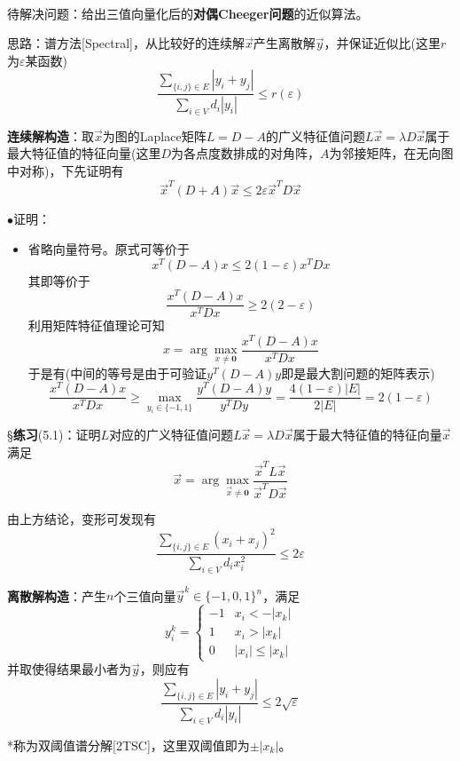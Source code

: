 \documentclass[a4paper,UTF8,fontset=windows]{ctexart}
\newcommand{\exce}[2]{\S\textbf{练习}(#1)：{\kaishu #2}}
\newcommand{\proo}[1]{{\kaishu $\bullet$证明：
\begin{itemize}
    \item[] #1
\end{itemize}
}}
\begin{document}
\

待解决问题：给出三值向量化后的\textbf{对偶Cheeger问题}的近似算法。

思路：谱方法[Spectral]，从比较好的连续解$\vec{x}$产生离散解$\vec{y}$，并保证近似比(这里$r$为$\varepsilon$某函数)
$$\frac{\sum_{\{i,j\}\in E}|y_i+y_j|}{\sum_{i\in V}d_i|y_i|}\le r(\varepsilon)$$

\textbf{连续解构造}：取$\vec{x}$为图的Laplace矩阵$L=D-A$的广义特征值问题$L\vec{x}=\lambda D\vec{x}$属于最大特征值的特征向量(这里$D$为各点度数排成的对角阵，$A$为邻接矩阵，在无向图中对称)，下先证明有
$$\vec{x}^T(D+A)\vec{x}\le2\varepsilon\vec{x}^TD\vec{x}$$
\proo{
    省略向量符号。原式可等价于
    $$x^T(D-A)x\le2(1-\varepsilon)x^TDx$$
    其即等价于
    $$\frac{x^T(D-A)x}{x^TDx}\ge2(2-\varepsilon)$$
    利用矩阵特征值理论可知
    $$x=\arg\max_{x\ne\mathbf{0}}\frac{x^T(D-A)x}{x^TDx}$$
    于是有(中间的等号是由于可验证$y^T(D-A)y$即是最大割问题的矩阵表示)
    $$\frac{x^T(D-A)x}{x^TDx}\ge\max_{y_i\in\{-1,1\}}\frac{y^T(D-A)y}{y^TDy}=\frac{4(1-\varepsilon)|E|}{2|E|}=2(1-\varepsilon)$$
}

\exce{5.1}{证明$L$对应的广义特征值问题$L\vec{x}=\lambda D\vec{x}$属于最大特征值的特征向量$\vec{x}$满足
$$\vec{x}=\arg\max_{\vec{x}\ne\mathbf{0}}\frac{\vec{x}^TL\vec{x}}{\vec{x}^TD\vec{x}}$$}

由上方结论，变形可发现有
$$\frac{\sum_{\{i,j\}\in E}(x_i+x_j)^2}{\sum_{i\in V}d_ix_i^2}\le 2\varepsilon$$

\textbf{离散解构造}：产生$n$个三值向量$\vec{y}^k\in\{-1,0,1\}^n$，满足
$$y_i^k=\begin{cases}-1&x_i<-|x_k|\\1&x_i>|x_k|\\0&|x_i|\le|x_k|\end{cases}$$
并取使得结果最小者为$\vec{y}$，则应有
$$\frac{\sum_{\{i,j\}\in E}|y_i+y_j|}{\sum_{i\in V}d_i|y_i|}\le2\sqrt\varepsilon$$

*称为双阈值谱分解[2TSC]，这里双阈值即为$\pm|x_k|$。
\end{document}
